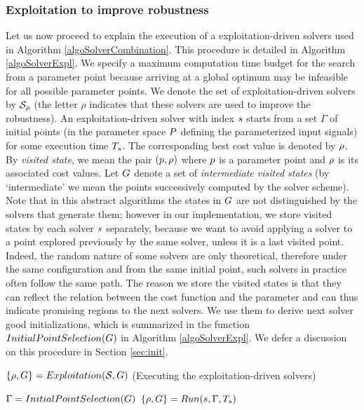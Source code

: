\subsubsection*{Exploitation to improve robustness}
Let us now proceed to explain the execution of a exploitation-driven solvers used in Algorithm \ref{algoSolverCombination}. This procedure is detailed in Algorithm \ref{algoSolverExpl}. We specify a maximum computation time budget for the search from a parameter point because arriving at a global optimum may be infeasible for all possible parameter points.  We denote the set of exploitation-driven solvers by $\mathcal{S_{\rho}}$ (the letter $\rho$ indicates that these solvers are used to improve the robustness). An exploitation-driven solver with index $s$ starts from a set $\Gamma$ of initial points (in the parameter space $P$ defining the parameterized input signals) for some execution time $T_{s}$. The corresponding best cost value is denoted by $\rho$. By {\em visited state}, we mean the pair $(p, \rho)$ where $p$ is a parameter point and $\rho$ is its associated cost values. Let $G$ denote a set of {\em intermediate visited states} (by `intermediate' we mean the points successively computed by the solver scheme). Note that in this abstract algorithms the states in $G$ are not distinguished by the solvers that generate them; however in our implementation, we store visited states by each solver $s$ separately, because we want to avoid applying a solver to a point explored previously by the same solver, unless it is a last visited point. Indeed, the random nature of some solvers are only theoretical, therefore under the same configuration and from the same initial point, such solvers in practice often follow the same path. The reason we store the visited states is that they can reflect the relation between the cost function and the parameter and can thus indicate promising regions to the next solvers. We use them to derive next solver good initializations, which is summarized in the function $InitialPointSelection(G)$ in Algorithm \ref{algoSolverExpl}. We defer a discussion on this procedure in Section \ref{sec:init}.

\begin{algorithm}
\caption{$\{ \rho, G \}=Exploitation(\mathcal{S}, G)$ 
(Executing the exploitation-driven solvers) \label{algoSolverExpl}}
\begin{algorithmic}
		\ForAll{$\solver \in \solversetall$} 
		\State $\Gamma = InitialPointSelection(G)$
		\State {}
  		\State $\{ \rho, G \} = Run(s, \Gamma, T_{s})$ 
		\EndFor
\end{algorithmic}
\end{algorithm}


